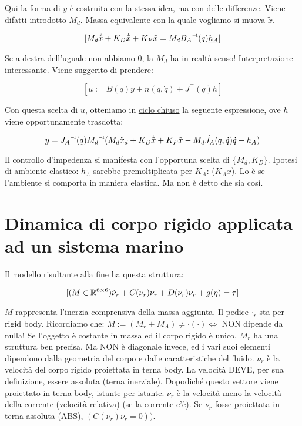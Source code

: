 Qui la forma di $y$ è costruita con la stessa idea, ma con delle differenze. Viene difatti introdotto $M_d$. Massa equivalente con la quale vogliamo si muova $\tilde{x}$.

\[
	[M_d\ddot{\tilde{x}} + K_D\dot{\tilde{x}} + K_P\tilde{x} = M_d\inv{B_A}(q)\underline{h_A}]
\]

Se a destra dell'uguale non abbiamo 0, la $M_d$ ha in realtà senso! Interpretazione interessante.
Viene suggerito di prendere:

\[
	[u := B(q)y+n(q,\dot{q}) + J^\top(q)h]
\]

Con questa scelta di $u$, otteniamo in \underline{ciclo chiuso} la seguente espressione, ove $h$ viene opportunamente trasdotta:

\[
	y = \inv{J_A}(q)\inv{M_d}(M_d\ddot{x}_d + K_D\dot{\tilde{x}} + K_P\tilde{x} - M_d\dot{J_A}(q,\dot{q})\dot{q} - h_A)
\]

Il controllo d'impedenza si manifesta con l'opportuna scelta di $\{M_d,K_D\}$. Ipotesi di ambiente elastico: $h_A$ sarebbe premoltiplicata per $K_A$: ($K_Ax$). Lo è se l'ambiente si comporta in maniera elastica. Ma non è detto che sia così.

\section{Dinamica di corpo rigido applicata ad un sistema marino}

Il modello risultante alla fine ha questa struttura:

\[
	[(M\in\mathbb{R}^{6\times 6})\dot{\nu}_r + C(\nu_r)\nu_r + D(\nu_r)\nu_r + g(\eta) = \tau]
\]

$M$ rappresenta l'inerzia comprensiva della massa aggiunta. Il pedice $\mathord{\cdot}_r$ sta per rigid body. Ricordiamo che: $M:=(M_r+M_A)\neq \mathord{\cdot}(\mathord{\cdot})\iff$ NON dipende da nulla! Se l'oggetto è costante in massa ed il corpo rigido è unico, $M_r$ ha una struttura ben precisa. Ma NON è diagonale invece, ed i vari suoi elementi dipendono dalla geometria del corpo e dalle caratteristiche del fluido. $\nu_r$ è la velocità del corpo rigido proiettata in terna body. La velocità DEVE, per sua definizione, essere assoluta (terna inerziale). Dopodiché questo vettore viene proiettato in terna body, istante per istante. $\nu_r$ è la velocità meno la velocità della corrente (velocità relativa) (se la corrente c'è). Se $\nu_r$ fosse proiettata in terna assoluta (ABS), $(C(\nu_r)\nu_r=0))$. 

